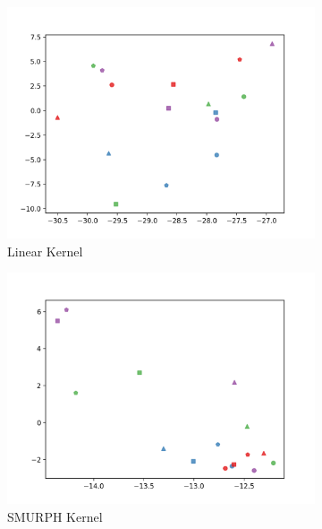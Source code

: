 \documentclass[10pt]{article}
\begin{document}
\begin{figure}[H]
    \centering
    \begin{subfigure}[h]{0.33\textwidth}
        \includegraphics[width=\linewidth]{mh_linear}
        \caption{Linear Kernel}
    \end{subfigure}
    \begin{subfigure}[h]{0.33\textwidth}
        \includegraphics[width=\linewidth]{mh_smurf}
        \caption{SMURPH Kernel}
    \end{subfigure}%
    \begin{subfigure}[h]{0.33\textwidth}

\end{subfigure}
\end{figure}
\end{document}
